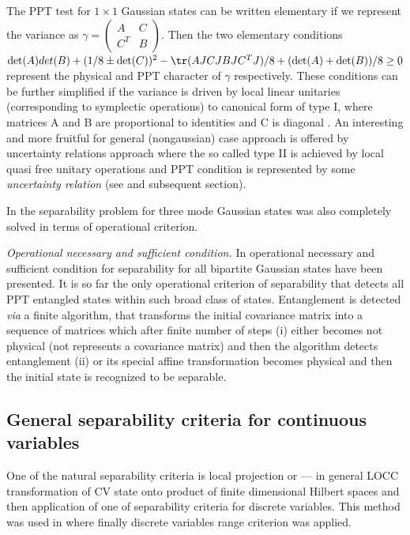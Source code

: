 \documentclass[twocolumn,aps,rmp]{revtex4}
\begin{document}
The PPT test for $1\times 1$ Gaussian states
can be written elementary if we represent the
variance as $\gamma=\left(
\begin{array}{cc}
A &C\\
C^{T} &B
\end{array} \right)$.
Then the two elementary conditions \cite{Simon} $\det(A)det(B)+(1/8
\pm \det(C))^{2} - \tr(AJCJBJC^{T}J)/8 + (\det(A) +\det(B))/8 \geq 0$
represent the physical and PPT character of $\gamma$ respectively.
These conditions can be further simplified if the variance is driven
by local linear unitaries (corresponding to symplectic operations)
to canonical form of type I, where matrices A and B are proportional
to identities and C is diagonal \cite{Simon}. An interesting and
more fruitful for general (nongaussian) case approach is offered by
uncertainty relations approach where the so called type II is
achieved by local quasi free unitary operations and PPT condition is
represented by some {\it uncertainty relation}
(see \cite{DuanGCZ1999-criterion} and subsequent section).

In \cite{1x1x1} the separability problem for three mode Gaussian
states was also completely solved in terms of operational criterion.

{\it Operational necessary and sufficient condition.}  In
\cite{GaussianAlgorithm} operational necessary and sufficient
condition for separability for all bipartite Gaussian states have been
presented. It is so far the only operational criterion of separability
that detects all PPT entangled states within such broad class of
states. Entanglement is detected {\it via} a finite algorithm, that
transforms the initial covariance matrix into a sequence of matrices
which after finite number of steps (i) either becomes not physical
(not represents a covariance matrix) and then the algorithm detects
entanglement (ii) or its special affine transformation becomes
physical and then the initial state is recognized to be separable.



\subsection{General separability criteria for continuous variables}
\label{subsec:sep_cont_var}

One of the natural separability criteria is local projection or --- in
general LOCC transformation of CV state onto product of finite
dimensional Hilbert spaces and then application of one of separability
criteria for discrete variables. This method was used in
\cite{boundCV} where finally discrete variables range criterion was
applied.
\end{document}
